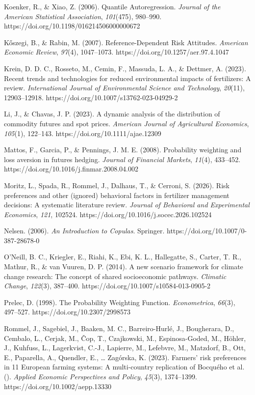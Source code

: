 \documentclass[
]{article}
\begin{document}
Koenker, R., \& Xiao, Z. (2006). Quantile Autoregression. \emph{Journal
of the American Statistical Association}, \emph{101}(475), 980--990.
https://doi.org/10.1198/016214506000000672

Kőszegi, B., \& Rabin, M. (2007). Reference-Dependent Risk Attitudes.
\emph{American Economic Review}, \emph{97}(4), 1047--1073.
https://doi.org/10.1257/aer.97.4.1047

Krein, D. D. C., Rosseto, M., Cemin, F., Massuda, L. A., \& Dettmer, A.
(2023). Recent trends and technologies for reduced environmental impacts
of fertilizers: A review. \emph{International Journal of Environmental
Science and Technology}, \emph{20}(11), 12903--12918.
https://doi.org/10.1007/s13762-023-04929-2

Li, J., \& Chavas, J. P. (2023). A dynamic analysis of the distribution
of commodity futures and spot prices. \emph{American Journal of
Agricultural Economics}, \emph{105}(1), 122--143.
https://doi.org/10.1111/ajae.12309

Mattos, F., Garcia, P., \& Pennings, J. M. E. (2008). Probability
weighting and loss aversion in futures hedging. \emph{Journal of
Financial Markets}, \emph{11}(4), 433--452.
https://doi.org/10.1016/j.finmar.2008.04.002

Moritz, L., Spada, R., Rommel, J., Dalhaus, T., \& Cerroni, S. (2026).
Risk preferences and other (ignored) behavioral factors in fertilizer
management decisions: A systematic literature review. \emph{Journal of
Behavioral and Experimental Economics}, \emph{121}, 102524.
https://doi.org/10.1016/j.socec.2026.102524

Nelsen. (2006). \emph{An Introduction to Copulas}. Springer.
https://doi.org/10.1007/0-387-28678-0

O'Neill, B. C., Kriegler, E., Riahi, K., Ebi, K. L., Hallegatte, S.,
Carter, T. R., Mathur, R., \& van Vuuren, D. P. (2014). A new scenario
framework for climate change research: The concept of shared
socioeconomic pathways. \emph{Climatic Change}, \emph{122}(3), 387--400.
https://doi.org/10.1007/s10584-013-0905-2

Prelec, D. (1998). The Probability Weighting Function.
\emph{Econometrica}, \emph{66}(3), 497--527.
https://doi.org/10.2307/2998573

Rommel, J., Sagebiel, J., Baaken, M. C., Barreiro-Hurlé, J., Bougherara,
D., Cembalo, L., Cerjak, M., Čop, T., Czajkowski, M., Espinosa-Goded,
M., Höhler, J., Kuhfuss, L., Lagerkvist, C.-J., Lapierre, M., Lefebvre,
M., Matzdorf, B., Ott, E., Paparella, A., Quendler, E., \ldots{}
Zagórska, K. (2023). Farmers' risk preferences in 11 European farming
systems: A multi-country replication of Bocquého et al. ().
\emph{Applied Economic Perspectives and Policy}, \emph{45}(3),
1374--1399. https://doi.org/10.1002/aepp.13330
\end{document}
